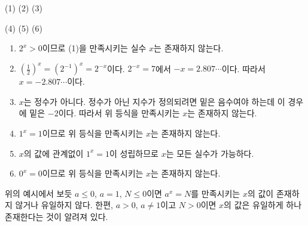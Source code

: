 \documentclass{oblivoir}
\begin{document}
%
\label{log5}
\par\vspace{-10pt}\noindent
(1)\:
(2)\:
(3)\:
\medskip\par\noindent
(4)\:
(5)\:
(6)\:
\begin{mdframed}
\begin{enumerate}
\item
\(2^x>0\)이므로 (1)을 만족시키는 실수 \(x\)는 존재하지 않는다.
\item
\((\frac12)^x=(2^{-1})^x=2^{-x}\)이다.
\(2^{-x}=7\)에서 \(-x=2.807\cdots\)이다.
따라서 \(x=-2.807\cdots\)이다.
\item
\(x\)는 정수가 아니다.
정수가 아닌 지수가 정의되려면 밑은 음수여야 하는데 이 경우에 밑은 \(-2\)이다.
따라서 위 등식을 만족시키는 \(x\)는 존재하지 않는다.
\item
\(1^x=1\)이므로 위 등식을 만족시키는 \(x\)는 존재하지 않는다.
\item
\(x\)의 값에 관계없이 \(1^x=1\)이 성립하므로 \(x\)는 모든 실수가 가능하다.
\item
\(0^x=0\)이므로 위 등식을 만족시키는 \(x\)는 존재하지 않는다.
\end{enumerate}
\end{mdframed}
위의 예시에서 보듯 \(a\le0\), \(a=1\), \(N\le0\)이면 \(a^x=N\)를 만족시키는 \(x\)의 값이 존재하지 않거나 유일하지 않다.
한편, \(a>0\), \(a\neq1\)이고 \(N>0\)이면 \(x\)의 값은 유일하게 하나 존재한다는 것이 알려져 있다.
\end{document}
